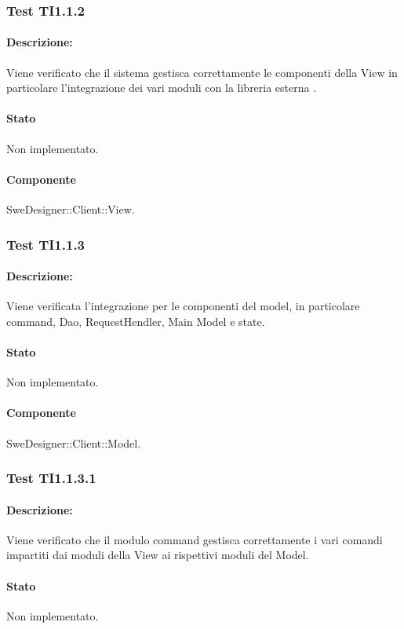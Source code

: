 \documentclass[../PianoDiQualifica.tex]{subfiles}
\begin{document}
	\subsubsection{Test TI1.1.2}
	\paragraph{Descrizione:} Viene verificato che il sistema gestisca correttamente le componenti della View in particolare l'integrazione dei vari moduli con la libreria esterna  . %
	\paragraph{Stato} Non implementato.
	\paragraph{Componente} SweDesigner::Client::View.
	
	\subsubsection{Test TI1.1.3}
	\paragraph{Descrizione:} Viene verificata l'integrazione per le componenti del model, in particolare command, Dao, RequestHendler, Main Model e state.
	\paragraph{Stato} Non implementato.
	\paragraph{Componente} SweDesigner::Client::Model.
	
	\subsubsection{Test TI1.1.3.1}
	\paragraph{Descrizione:} Viene verificato che il modulo command gestisca correttamente i vari comandi impartiti dai moduli della View ai rispettivi moduli del Model.
	\paragraph{Stato} Non implementato.
\end{document}
